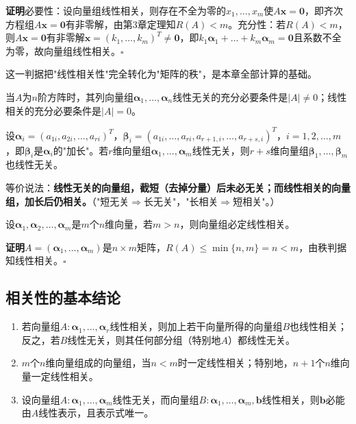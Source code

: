 \textbf{证明}\quad 必要性：设向量组线性相关，则存在不全为零的$x_1,\dots,x_m$使$A\boldsymbol{x}=\boldsymbol{0}$，即齐次方程组$A\boldsymbol{x}=\boldsymbol{0}$有非零解，由第3章定理知$R(A)<m$。充分性：若$R(A)<m$，则$A\boldsymbol{x}=\boldsymbol{0}$有非零解$\boldsymbol{x}=(k_1,\dots,k_m)^{T}\ne\boldsymbol{0}$，即$k_1\boldsymbol{\alpha}_1+\dots+k_m\boldsymbol{\alpha}_m=\boldsymbol{0}$且系数不全为零，故向量组线性相关。\hfill$\square$

这一判据把"线性相关性"完全转化为"矩阵的秩"，是本章全部计算的基础。

\begin{corollary}
当$A$为$n$阶方阵时，其列向量组$\boldsymbol{\alpha}_1,\dots,\boldsymbol{\alpha}_n$线性无关的充分必要条件是$|A|\ne 0$；线性相关的充分必要条件是$|A|=0$。
\end{corollary}

\begin{corollary}[加长向量组]
设$\boldsymbol{\alpha}_i=(a_{1i},a_{2i},\dots,a_{ri})^{T}$，$\boldsymbol{\beta}_i=(a_{1i},\dots,a_{ri},a_{r+1,i},\dots,a_{r+s,i})^{T}$，$i=1,2,\dots,m$，即$\boldsymbol{\beta}_i$是$\boldsymbol{\alpha}_i$的"加长"。若$r$维向量组$\boldsymbol{\alpha}_1,\dots,\boldsymbol{\alpha}_m$线性无关，则$r+s$维向量组$\boldsymbol{\beta}_1,\dots,\boldsymbol{\beta}_m$也线性无关。
\end{corollary}

等价说法：\textbf{线性无关的向量组，截短（去掉分量）后未必无关；而线性相关的向量组，加长后仍相关。}（"短无关$\Rightarrow$长无关"，"长相关$\Rightarrow$短相关"。）

\begin{theorem}[向量个数多于维数必相关]
设$\boldsymbol{\alpha}_1,\boldsymbol{\alpha}_2,\dots,\boldsymbol{\alpha}_m$是$m$个$n$维向量，若$m>n$，则向量组必定线性相关。
\end{theorem}

\textbf{证明}\quad $A=(\boldsymbol{\alpha}_1,\dots,\boldsymbol{\alpha}_m)$是$n\times m$矩阵，$R(A)\le\min\{n,m\}=n<m$，由秩判据知线性相关。\hfill$\square$

\subsection{相关性的基本结论}
\begin{theorem}[相关性的三条基本结论]
\begin{enumerate}
    \item 若向量组$A:\boldsymbol{\alpha}_1,\dots,\boldsymbol{\alpha}_r$线性相关，则加上若干向量所得的向量组$B$也线性相关；反之，若$B$线性无关，则其任何部分组（特别地$A$）都线性无关。
    \item $m$个$n$维向量组成的向量组，当$n<m$时一定线性相关；特别地，$n+1$个$n$维向量一定线性相关。
    \item 设向量组$A:\boldsymbol{\alpha}_1,\dots,\boldsymbol{\alpha}_m$线性无关，而向量组$B:\boldsymbol{\alpha}_1,\dots,\boldsymbol{\alpha}_m,\boldsymbol{b}$线性相关，则$\boldsymbol{b}$必能由$A$线性表示，且表示式唯一。
\end{enumerate}
\end{theorem}

